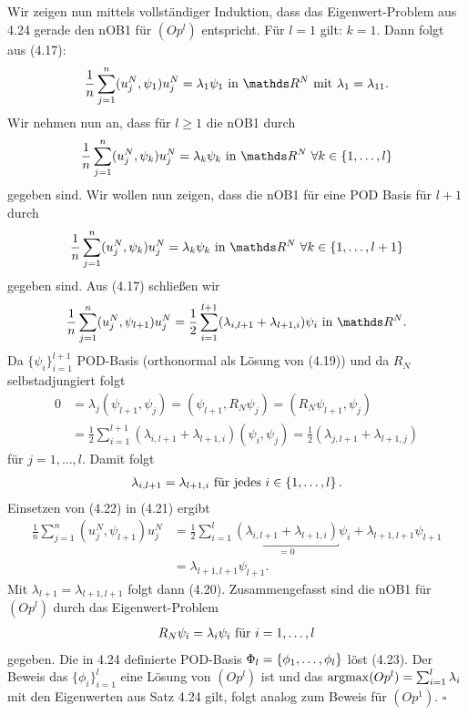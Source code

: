 Wir zeigen nun mittels vollständiger Induktion, dass das Eigenwert-Problem aus 4.24 gerade den nOB1 für $(Op^l)$ entspricht.
Für $l=1$ gilt: $k=1$. 
Dann folgt aus (4.17):
\[
\frac{1}{n} \sum_{j=1}^n (u_j^N,\psi_1) u_j^N = \lambda_1\psi_1 \text{ in } \R^N \text{ mit } \lambda_1 =\lambda_{11}.
\]
Wir nehmen nun an, dass für $l\ge 1$ die nOB1 durch
\begin{align}
\frac{1}{n} \sum_{j=1}^n (u_j^N,\psi_k) u_j^N = \lambda_k\psi_k \text{ in } \R^N ~\forall k\in\{1\dt{,}l\}
\end{align}
gegeben sind.
Wir wollen nun zeigen, dass die nOB1 für eine POD Basis f\"{u}r $l+1$ durch
\begin{align}
\frac{1}{n} \sum_{j=1}^n (u_j^N,\psi_k) u_j^N = \lambda_k\psi_k \text{ in } \R^N ~\forall k\in\{1\dt{,}l+1\}
\end{align}
gegeben sind.
Aus (4.17) schließen wir
\begin{align}
\frac{1}{n} \sum_{j=1}^n (u_j^N,\psi_{l+1}) u_j^N = \frac{1}{2} \sum_{i=1}^{l+1} (\lambda_{i,l+1}+\lambda_{l+1,i})\psi_i \text{ in } \R^N.
\end{align}
Da $\{\psi_i\}_{i=1}^{l+1}$ POD-Basis (orthonormal als Lösung von (4.19)) und da $R_N$ selbstadjungiert folgt
\begin{align*}
0 &= \lambda_j(\psi_{l+1},\psi_j) = (\psi_{l+1},R_N\psi_j) = (R_N\psi_{l+1},\psi_j)\\
&= \frac{1}{2} \sum_{i=1}^{l+1} (\lambda_{i,l+1}+\lambda_{l+1,i}) (\psi_i,\psi_j) = \frac{1}{2} (\lambda_{j,l+1}+\lambda_{l+1,j})
\end{align*}
f\"{u}r $j=1,...,l$. Damit folgt
\begin{align}
\lambda_{i,l+1} = \lambda_{l+1,i} \text{ für jedes } i\in\left\{1, \dots ,l\right\}.
\end{align}
Einsetzen von (4.22) in (4.21) ergibt
\begin{align*}
\frac{1}{n} \sum_{j=1}^n (u_j^N,\psi_{l+1}) u_j^N &= \frac{1}{2} \sum_{i=1}^{l} \underbracket{(\lambda_{i,l+1}+\lambda_{l+1,i})}_{=0}\psi_i + \lambda_{l+1,l+1}\psi_{l+1}\\
&= \lambda_{l+1,l+1}\psi_{l+1}.
\end{align*}
Mit $\lambda_{l+1}=\lambda_{l+1,l+1}$ folgt dann (4.20).
Zusammengefasst sind die nOB1 für $(Op^l)$ durch das Eigenwert-Problem
\begin{align}
R_N\psi_i = \lambda_i\psi_i \text{ für } i=1, \dots ,l
\end{align}
gegeben.
Die in 4.24 definierte POD-Basis $\Phi_l=\left\{\phi_1, \dots ,\phi_l\right\}$ löst (4.23).
Der Beweis das $\{\phi_i\}_{i=1}^l$ eine Lösung von $(Op^l)$ ist und das $\operatorname{argmax} (Op^l)=\sum_{i=1}^l \lambda_i$ mit den Eigenwerten aus Satz 4.24 gilt, folgt analog zum Beweis für $(Op^1)$.
\hfill $\square$

